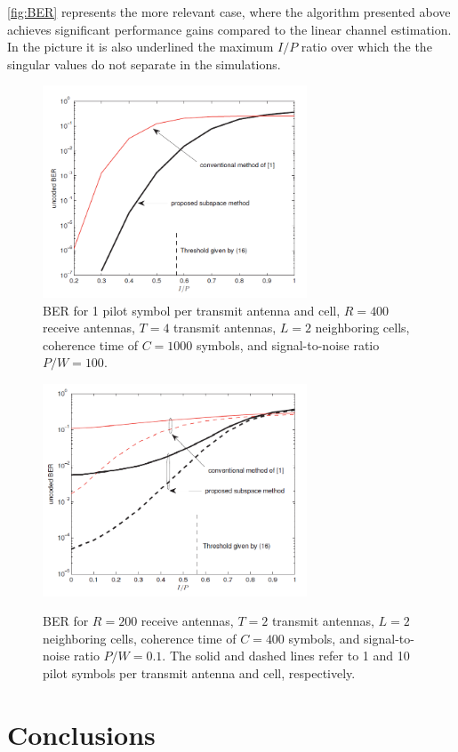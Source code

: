 \documentclass[11pt]{book}
\begin{document}
\autoref{fig:BER} represents the more relevant case, where the algorithm presented above achieves significant performance gains compared to the linear channel estimation. In the picture it is also underlined the maximum $I/P$ ratio over which the the singular values do not separate in the simulations.

\begin{figure}
  \centering
  \includegraphics[width = 0.7\textwidth]{SNRvsMarzetta.png}
  \caption{\footnotesize{BER for 1 pilot symbol per transmit antenna and cell, $R = 400$
  receive antennas, $T = 4$ transmit antennas, $L = 2$ neighboring cells, coherence time  of $C = 1000$ symbols, and signal-to-noise ratio $P/W = 100$.}}
  \label{fig:SNR}
\end{figure}
\begin{figure}
  \centering
  \includegraphics[width = 0.7\textwidth]{BERvsMarzetta.png}
  \label{fig:BER}
  \caption{\footnotesize{BER for $R = 200$ receive antennas, $T = 2$ transmit antennas, $L = 2$ neighboring cells, coherence time of $C = 400$ symbols, and signal-to-noise ratio $P/W = 0.1$. The solid and dashed lines refer to 1 and 10 pilot symbols per transmit antenna and cell, respectively.}}
\end{figure}
\section{Conclusions}


\end{document}
